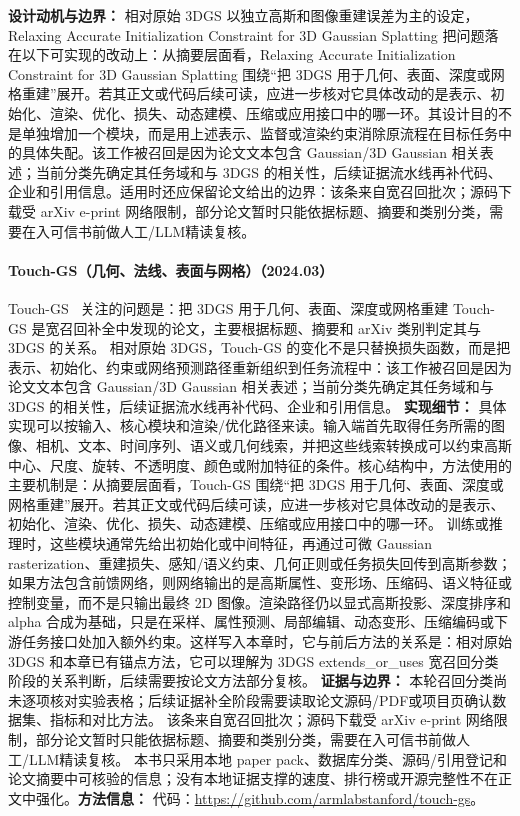 \textbf{设计动机与边界：} 相对原始 3DGS 以独立高斯和图像重建误差为主的设定，Relaxing Accurate Initialization Constraint for 3D Gaussian Splatting 把问题落在以下可实现的改动上：从摘要层面看，Relaxing Accurate Initialization Constraint for 3D Gaussian Splatting 围绕“把 3DGS 用于几何、表面、深度或网格重建”展开。若其正文或代码后续可读，应进一步核对它具体改动的是表示、初始化、渲染、优化、损失、动态建模、压缩或应用接口中的哪一环。其设计目的不是单独增加一个模块，而是用上述表示、监督或渲染约束消除原流程在目标任务中的具体失配。该工作被召回是因为论文文本包含 Gaussian/3D Gaussian 相关表述；当前分类先确定其任务域和与 3DGS 的相关性，后续证据流水线再补代码、企业和引用信息。适用时还应保留论文给出的边界：该条来自宽召回批次；源码下载受 arXiv e-print 网络限制，部分论文暂时只能依据标题、摘要和类别分类，需要在入可信书前做人工/LLM精读复核。
\paragraph{Touch-GS（几何、法线、表面与网格）（2024.03）}
Touch-GS~\cite{2403_09875} 关注的问题是：把 3DGS 用于几何、表面、深度或网格重建 Touch-GS 是宽召回补全中发现的论文，主要根据标题、摘要和 arXiv 类别判定其与 3DGS 的关系。
相对原始 3DGS，Touch-GS 的变化不是只替换损失函数，而是把表示、初始化、约束或网络预测路径重新组织到任务流程中：该工作被召回是因为论文文本包含 Gaussian/3D Gaussian 相关表述；当前分类先确定其任务域和与 3DGS 的相关性，后续证据流水线再补代码、企业和引用信息。
\textbf{实现细节：} 具体实现可以按输入、核心模块和渲染/优化路径来读。输入端首先取得任务所需的图像、相机、文本、时间序列、语义或几何线索，并把这些线索转换成可以约束高斯中心、尺度、旋转、不透明度、颜色或附加特征的条件。核心结构中，方法使用的主要机制是：从摘要层面看，Touch-GS 围绕“把 3DGS 用于几何、表面、深度或网格重建”展开。若其正文或代码后续可读，应进一步核对它具体改动的是表示、初始化、渲染、优化、损失、动态建模、压缩或应用接口中的哪一环。 训练或推理时，这些模块通常先给出初始化或中间特征，再通过可微 Gaussian rasterization、重建损失、感知/语义约束、几何正则或任务损失回传到高斯参数；如果方法包含前馈网络，则网络输出的是高斯属性、变形场、压缩码、语义特征或控制变量，而不是只输出最终 2D 图像。渲染路径仍以显式高斯投影、深度排序和 alpha 合成为基础，只是在采样、属性预测、局部编辑、动态变形、压缩编码或下游任务接口处加入额外约束。这样写入本章时，它与前后方法的关系是：相对原始 3DGS 和本章已有锚点方法，它可以理解为 3DGS extends\_or\_uses 宽召回分类阶段的关系判断，后续需要按论文方法部分复核。
\textbf{证据与边界：} 本轮召回分类尚未逐项核对实验表格；后续证据补全阶段需要读取论文源码/PDF或项目页确认数据集、指标和对比方法。 该条来自宽召回批次；源码下载受 arXiv e-print 网络限制，部分论文暂时只能依据标题、摘要和类别分类，需要在入可信书前做人工/LLM精读复核。 本书只采用本地 paper pack、数据库分类、源码/引用登记和论文摘要中可核验的信息；没有本地证据支撑的速度、排行榜或开源完整性不在正文中强化。\textbf{方法信息：} 代码：\url{https://github.com/armlabstanford/touch-gs}。
